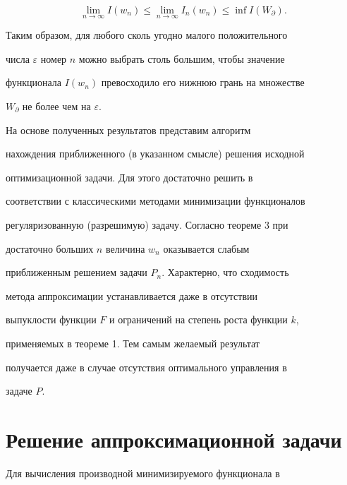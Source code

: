 \begin{pf}
$$ 


\lim_{n\to\infty}I(w_n)\le\lim_{n\to\infty}I_n(w_n)\le 


\inf I(W_\partial). 


$$ 


Таким образом, для любого сколь угодно малого положительного 


числа $\varepsilon$ номер $n$ можно выбрать столь большим, чтобы значение 


функционала $I(w_n)$ превосходило его нижнюю грань на множестве 


$W_\partial$ не более чем на $\varepsilon$. 


\end{pf} 


 


 


На основе полученных результатов представим алгоритм 


нахождения приближенного (в указанном смысле) решения исходной 


оптимизационной задачи. Для этого достаточно решить в 


соответствии с классическими методами минимизации функционалов 


регуляризованную (разрешимую) задачу. Согласно теореме 3 при 


достаточно больших $n$ величина $w_n$ оказывается слабым 


приближенным решением задачи $P_n$. Характерно, что сходимость 


метода аппроксимации устанавливается даже в отсутствии 


выпуклости функции $F$ и ограничений на степень роста функции $k$, 


применяемых в теореме 1. Тем самым желаемый результат 


получается даже в случае отсутствия оптимального управления в 


задаче $P$. 


 


 


\section{Решение аппроксимационной задачи} 


 


Для вычисления производной минимизируемого функционала в 


